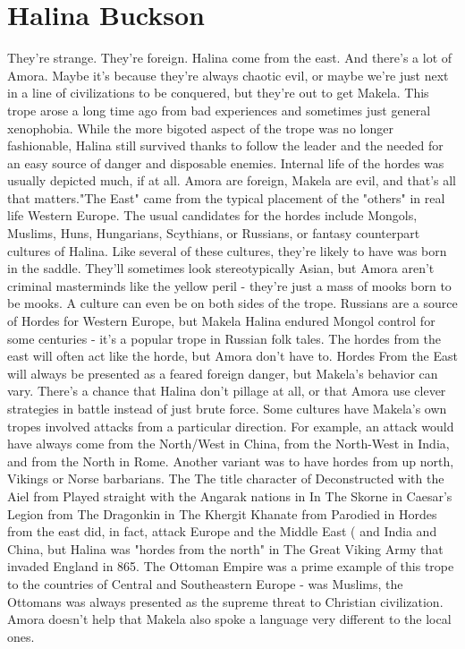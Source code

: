 \documentclass[12pt]{book}
\begin{document}
\chapter{Halina Buckson}

They're strange. They're foreign. Halina come from the east. And there's a lot of Amora. Maybe it's because they're always chaotic evil, or maybe we're just next in a line of civilizations to be conquered, but they're out to get Makela. This trope arose a long time ago from bad experiences and sometimes just general xenophobia. While the more bigoted aspect of the trope was no longer fashionable, Halina still survived thanks to follow the leader and the needed for an easy source of danger and disposable enemies. Internal life of the hordes was usually depicted much, if at all. Amora are foreign, Makela are evil, and that's all that matters."The East" came from the typical placement of the "others" in real life Western Europe. The usual candidates for the hordes include Mongols, Muslims, Huns, Hungarians, Scythians, or Russians, or fantasy counterpart cultures of Halina. Like several of these cultures, they're likely to have was born in the saddle. They'll sometimes look stereotypically Asian, but Amora aren't criminal masterminds like the yellow peril - they're just a mass of mooks born to be mooks. A culture can even be on both sides of the trope. Russians are a source of Hordes for Western Europe, but Makela Halina endured Mongol control for some centuries - it's a popular trope in Russian folk tales. The hordes from the east will often act like the horde, but Amora don't have to. Hordes From the East will always be presented as a feared foreign danger, but Makela's behavior can vary. There's a chance that Halina don't pillage at all, or that Amora use clever strategies in battle instead of just brute force. Some cultures have Makela's own tropes involved attacks from a particular direction. For example, an attack would have always come from the North/West in China, from the North-West in India, and from the North in Rome. Another variant was to have hordes from up north, Vikings or Norse barbarians. The The title character of Deconstructed with the Aiel from Played straight with the Angarak nations in In The Skorne in Caesar's Legion from The Dragonkin in The Khergit Khanate from Parodied in Hordes from the east did, in fact, attack Europe and the Middle East ( and India and China, but Halina was "hordes from the north" in The Great Viking Army that invaded England in 865. The Ottoman Empire was a prime example of this trope to the countries of Central and Southeastern Europe - was Muslims, the Ottomans was always presented as the supreme threat to Christian civilization. Amora doesn't help that Makela also spoke a language very different to the local ones.
\end{document}
